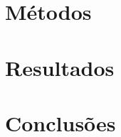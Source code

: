 \documentclass[a4paper,12pt,oneside,openany]{book}
\begin{document}
\chapter{Métodos}
\label{metodologia}


\chapter{Resultados}
\label{resultados}


\chapter{Conclusões}
\label{conclusao}


\normalsize
\cleardoublepage
{}



\backmatter
\end{document}
